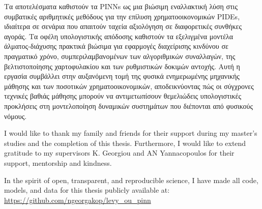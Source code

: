 \begin{greekabstract}
    Τα αποτελέσματα καθιστούν τα PINNs ως μια βιώσιμη εναλλακτική λύση στις συμβατικές αριθμητικές μεθόδους για την επίλυση χρηματοοικονομικών PIDEs, ιδιαίτερα σε σενάρια που απαιτούν ταχεία αξιολόγηση σε διαφορετικές συνθήκες αγοράς. Τα οφέλη υπολογιστικής απόδοσης καθιστούν τα εξελιγμένα μοντέλα άλματος-διάχυσης πρακτικά βιώσιμα για εφαρμογές διαχείρισης κινδύνου σε πραγματικό χρόνο, συμπεριλαμβανομένων των αλγοριθμικών συναλλαγών, της βελτιστοποίησης χαρτοφυλακίου και των ρυθμιστικών δοκιμών αντοχής. Αυτή η εργασία συμβάλλει στην αυξανόμενη τομή της φυσικά ενημερωμένης μηχανικής μάθησης και των ποσοτικών χρηματοοικονομικών, αποδεικνύοντας πώς οι σύγχρονες τεχνικές βαθιάς μάθησης μπορούν να αντιμετωπίσουν θεμελιώδεις υπολογιστικές προκλήσεις στη μοντελοποίηση δυναμικών συστημάτων που διέπονται από φυσικούς νόμους.
{}

\end{greekabstract}


\begin{acknowledgements}
    I would like to thank my family and friends for their support during my master's studies and the completion of this thesis. Furthermore, I would like to extend gratitude to my supervisors K. Georgiou and AN Yannacopoulos for their support, mentorship and kindness.
    
    \vspace{1}
    
    In the spirit of open, transparent, and reproducible science, I have made all code, models, and data for this thesis publicly available at: \url{https://github.com/ngeorgakop/levy_ou_pinn}
\end{acknowledgements}



\tableofcontents

\listoffigures

\listoftables



